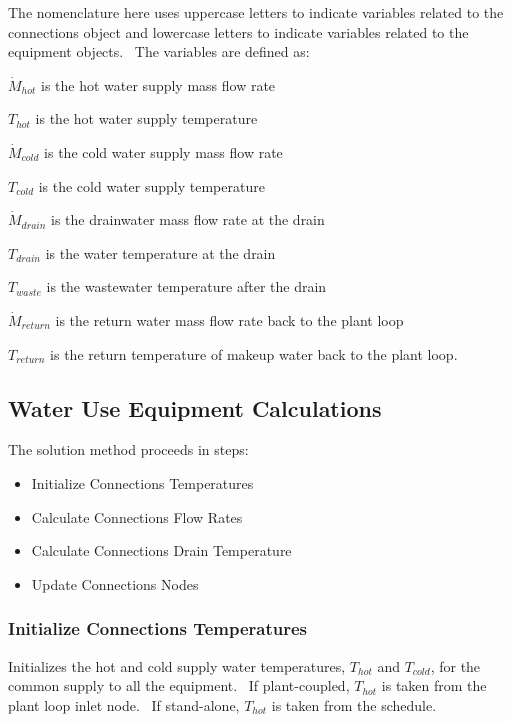 The nomenclature here uses uppercase letters to indicate variables related to the connections object and lowercase letters to indicate variables related to the equipment objects.~ The variables are defined as:

\({\dot M_{hot}}\) is the hot water supply mass flow rate

\({T_{hot}}\) is the hot water supply temperature

\({\dot M_{cold}}\) is the cold water supply mass flow rate

\({T_{cold}}\) is the cold water supply temperature

\({\dot M_{drain}}\) is the drainwater mass flow rate at the drain

\({T_{drain}}\) is the water temperature at the drain

\({T_{waste}}\) is the wastewater temperature after the drain

\({\dot M_{return}}\) is the return water mass flow rate back to the plant loop

\({T_{return}}\) is the return temperature of makeup water back to the plant loop.

\subsection{Water Use Equipment Calculations}\label{water-use-equipment-calculations}

The solution method proceeds in steps:

\begin{itemize}
\item Initialize Connections Temperatures
\item Calculate Connections Flow Rates
\item Calculate Connections Drain Temperature
\item Update Connections Nodes
\end{itemize}

\subsubsection{Initialize Connections Temperatures}\label{initialize-connections-temperatures}

Initializes the hot and cold supply water temperatures, \({T_{hot}}\) and \({T_{cold}}\), for the common supply to all the equipment.~ If plant-coupled, \({T_{hot}}\) is taken from the plant loop inlet node.~ If stand-alone, \({T_{hot}}\) is taken from the schedule.

